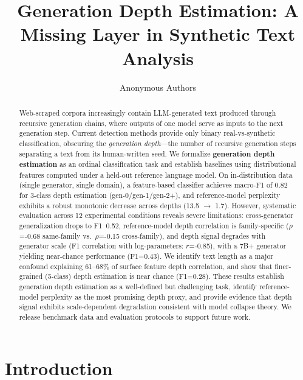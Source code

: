 \documentclass[11pt]{article}
\title{Generation Depth Estimation: A Missing Layer in Synthetic Text Analysis}
\author{
  Anonymous Authors
}
\date{}
\begin{document}
\maketitle

\begin{abstract}
Web-scraped corpora increasingly contain LLM-generated text produced through recursive generation chains, where outputs of one model serve as inputs to the next generation step.
Current detection methods provide only binary real-vs-synthetic classification, obscuring the \emph{generation depth}---the number of recursive generation steps separating a text from its human-written seed.
We formalize \textbf{generation depth estimation} as an ordinal classification task and establish baselines using distributional features computed under a held-out reference language model.
On in-distribution data (single generator, single domain), a feature-based classifier achieves macro-F1 of 0.82 for 3-class depth estimation (gen-0/gen-1/gen-2+), and reference-model perplexity exhibits a robust monotonic decrease across depths (13.5 $\to$ 1.7).
However, systematic evaluation across 12 experimental conditions reveals severe limitations: cross-generator generalization drops to F1~0.52, reference-model depth correlation is family-specific ($\rho$=-0.68 same-family vs.\ $\rho$=-0.15 cross-family), and depth signal degrades with generator scale (F1 correlation with log-parameters: $r$=-0.85), with a 7B+ generator yielding near-chance performance (F1=0.43).
We identify text length as a major confound explaining 61--68\% of surface feature depth correlation, and show that finer-grained (5-class) depth estimation is near chance (F1=0.28).
These results establish generation depth estimation as a well-defined but challenging task, identify reference-model perplexity as the most promising depth proxy, and provide evidence that depth signal exhibits scale-dependent degradation consistent with model collapse theory.
We release benchmark data and evaluation protocols to support future work.
\end{abstract}

\section{Introduction}
\label{sec:intro}
\end{document}
